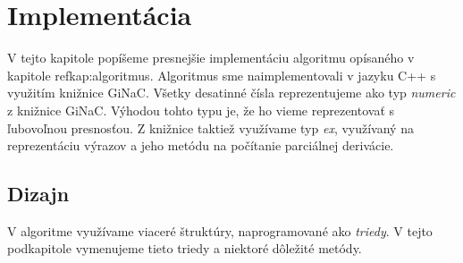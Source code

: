 \chapter{Implementácia}
\label{kap:implementation}

V tejto kapitole popíšeme presnejšie implementáciu algoritmu opísaného v kapitole ref{kap:algoritmus}.
Algoritmus sme naimplementovali v jazyku C++ s využitím knižnice GiNaC. Všetky desatinné čísla
reprezentujeme ako typ \textit{numeric} z knižnice GiNaC. Výhodou tohto typu je, že ho vieme 
reprezentovať s ľubovoľnou presnosťou. Z knižnice taktiež využívame typ \textit{ex}, využívaný na 
reprezentáciu výrazov a jeho metódu na počítanie parciálnej derivácie.

\section{Dizajn}

V algoritme využívame viaceré štruktúry, naprogramované ako \textit{triedy}. V tejto podkapitole
vymenujeme tieto triedy a niektoré dôležité metódy.

